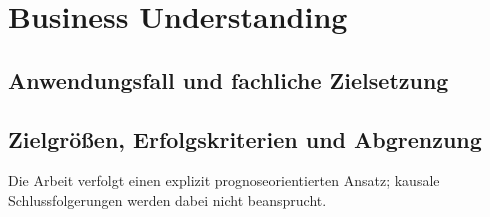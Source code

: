 \documentclass[12pt,a4paper]{article}
\begin{document}

\section{Business Understanding}
\subsection{Anwendungsfall und fachliche Zielsetzung}


\subsection{Zielgrößen, Erfolgskriterien und Abgrenzung}


Die Arbeit verfolgt einen explizit prognoseorientierten Ansatz; kausale Schlussfolgerungen werden
dabei nicht beansprucht.

\end{document}
